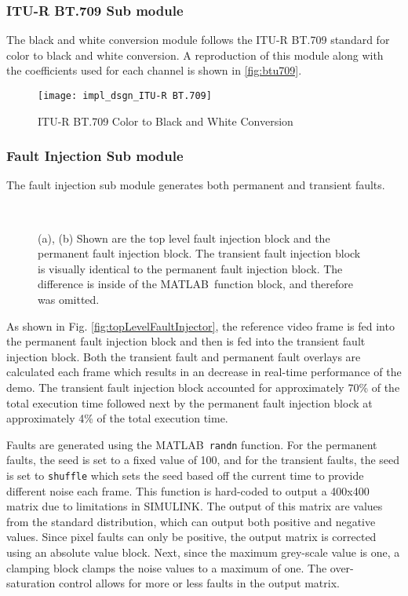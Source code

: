 \subsubsection{ITU-R BT.709 Sub module}
The black and white conversion module follows the ITU-R BT.709 standard for color to black and white conversion. A reproduction of this module along with the coefficients used for each channel is shown in \autoref{fig:btu709}.
\begin{figure}[H]
    \texttt{[image: impl\_dsgn\_ITU-R BT.709]}
    \caption{ITU-R BT.709 Color to Black and White Conversion}
    \label{fig:btu709}
\end{figure}

\subsubsection{Fault Injection Sub module}
The fault injection sub module generates both permanent and transient faults.
\begin{figure}[H]
    \\
    \caption{(a), (b) Shown are the top level fault injection block and the permanent fault injection block. The transient fault injection block is visually identical to the permanent fault injection block. The difference is inside of the MATLAB\textregisteredmark\ function block, and therefore was omitted.}
    \label{fig:faultInjection}
\end{figure}
\par As shown in Fig. \ref{fig:topLevelFaultInjector}, the reference video frame is fed into the permanent fault injection block and then is fed into the transient fault injection block. Both the transient fault and permanent fault overlays are calculated each frame which results in an decrease in real-time performance of the demo. The transient fault injection block accounted for approximately 70\% of the total execution time followed next by the permanent fault injection block at approximately 4\% of the total execution time.
\par Faults are generated using the MATLAB\textregisteredmark\ \verb!randn! function. For the permanent faults, the seed is set to a fixed value of 100, and for the transient faults, the seed is set to \verb!shuffle! which sets the seed based off the current time to provide different noise each frame. This function is hard-coded to output a 400x400 matrix due to limitations in SIMULINK\textregisteredmark. The output of this matrix are values from the standard distribution, which can output both positive and negative values. Since pixel faults can only be positive, the output matrix is corrected using an absolute value block. Next, since the maximum grey-scale value is one, a clamping block clamps the noise values to a maximum of one. The over-saturation control allows for more or less faults in the output matrix.
